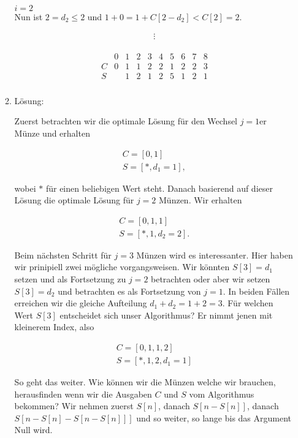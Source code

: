 \begin{solution}
\begin{enumerate}[label = \alph*]
\begin{enumerate}[label = \arabic*.]
    \underline{$i = 2$} \\
    Nun ist $2 = d_2 \leq 2$ und $1 + 0 = 1 + C[2 - d_2] < C[2] = 2$.

    \begin{align*}
      \vdots
    \end{align*}

    \begin{align*}
      \begin{array}{c|c|c|c|c|c|c|c|c|c}
          & 0 & 1 & 2 & 3 & 4 & 5 & 6 & 7 & 8 \\ \hline
        C & 0 & 1 & 1 & 2 & 2 & 1 & 2 & 2 & 3 \\ \hline
        S &   & 1 & 2 & 1 & 2 & 5 & 1 & 2 & 1 \\
      \end{array}
    \end{align*}

    \item Lösung:

    Zuerst betrachten wir die optimale Lösung für den Wechsel $j = 1$er Münze und erhalten

    \begin{align*}
      C = [0, 1] \\
      S = [\ast, d_1 = 1],
    \end{align*}

    wobei $\ast$ für einen beliebigen Wert steht. Danach basierend auf dieser Lösung die optimale Lösung für $j = 2$ Münzen. Wir erhalten

    \begin{align*}
      C = [0,1,1]\\
      S = [\ast, 1, d_2 = 2].
    \end{align*}

    Beim nächsten Schritt für $j = 3$ Münzen wird es interessanter. Hier haben wir prinipiell zwei mögliche vorgangsweisen. Wir könnten $S[3] = d_1$ setzen und als Fortsetzung zu $j = 2$ betrachten oder aber wir setzen $S[3] = d_2$ und betrachten es als Fortsetzung von $j = 1$. In beiden Fällen erreichen wir die gleiche Aufteilung $d_1 + d_2 = 1 + 2 = 3$. Für welchen Wert $S[3]$ entscheidet sich unser Algorithmus? Er nimmt jenen mit kleinerem Index, also

    \begin{align*}
      C = [0, 1, 1, 2]\\
      S = [\ast, 1, 2, d_1 = 1]
    \end{align*}

    So geht das weiter.
    Wie können wir die Münzen welche wir brauchen, herausfinden wenn wir die Ausgaben $C$ und $S$ vom Algorithmus bekommen? Wir nehmen zuerst $S[n]$, danach $S[n - S[n]]$, danach $S[n - S[n] - S[n - S[n]]]$ und so weiter, so lange bis das Argument Null wird. 


\end{enumerate}
\end{enumerate}
\end{solution}
